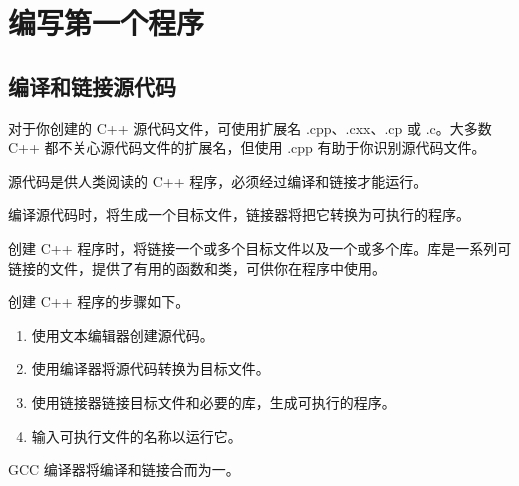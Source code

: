 \chapter{编写第一个程序}
\section{编译和链接源代码}
对于你创建的 C++ 源代码文件，可使用扩展名 .cpp、.cxx、.cp 或 .c。大多数 C++ 都不关心源代码文件的扩展名，但使用 .cpp 有助于你识别源代码文件。

源代码是供人类阅读的 C++ 程序，必须经过编译和链接才能运行。

编译源代码时，将生成一个目标文件，链接器将把它转换为可执行的程序。

创建 C++ 程序时，将链接一个或多个目标文件以及一个或多个库。库是一系列可链接的文件，提供了有用的函数和类，可供你在程序中使用。

创建 C++ 程序的步骤如下。
\begin{enumerate}
    \item 使用文本编辑器创建源代码。
    \item 使用编译器将源代码转换为目标文件。
    \item 使用链接器链接目标文件和必要的库，生成可执行的程序。
    \item 输入可执行文件的名称以运行它。
\end{enumerate}

GCC 编译器将编译和链接合而为一。